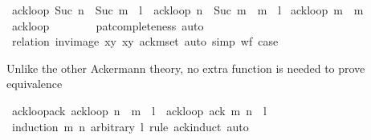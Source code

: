 \begin{isabellebody}
{\isacharbar}{\kern0pt}\ {\isachardoublequoteopen}ackloop\ {\isacharparenleft}{\kern0pt}Suc\ n\ {\isacharhash}{\kern0pt}\ Suc\ m\ {\isacharhash}{\kern0pt}\ l{\isacharparenright}{\kern0pt}\ {\isacharequal}{\kern0pt}\ ackloop\ {\isacharparenleft}{\kern0pt}n\ {\isacharhash}{\kern0pt}\ Suc\ m\ {\isacharhash}{\kern0pt}\ m\ {\isacharhash}{\kern0pt}\ l{\isacharparenright}{\kern0pt}{\isachardoublequoteclose}\isanewline
{\isacharbar}{\kern0pt}\ {\isachardoublequoteopen}ackloop\ {\isacharbrackleft}{\kern0pt}m{\isacharbrackright}{\kern0pt}\ {\isacharequal}{\kern0pt}\ m{\isachardoublequoteclose}\isanewline
{\isacharbar}{\kern0pt}\ {\isachardoublequoteopen}ackloop\ {\isacharbrackleft}{\kern0pt}{\isacharbrackright}{\kern0pt}\ {\isacharequal}{\kern0pt}\ \ {}{\isachardoublequoteclose}\isanewline
%
\isadelimproof
\ \ %
\endisadelimproof
%
\isatagproof
{}\isamarkupfalse%
\ pat{\isacharunderscore}{\kern0pt}completeness\ auto%
\endisatagproof
{\isafoldproof}%
%
\isadelimproof
\isanewline
%
\endisadelimproof
\isanewline
{}\isamarkupfalse%
\isanewline
%
\isadelimproof
\ \ %
\endisadelimproof
%
\isatagproof
{}\isamarkupfalse%
\ {\isacharparenleft}{\kern0pt}relation\ {\isachardoublequoteopen}inv{\isacharunderscore}{\kern0pt}image\ {\isacharbraceleft}{\kern0pt}{\isacharparenleft}{\kern0pt}x{\isacharcomma}{\kern0pt}y{\isacharparenright}{\kern0pt}{\isachardot}{\kern0pt}\ x{\isacharless}{\kern0pt}y{\isacharbraceright}{\kern0pt}\ ack{\isacharunderscore}{\kern0pt}mset{\isachardoublequoteclose}{\isacharparenright}{\kern0pt}\ {\isacharparenleft}{\kern0pt}auto\ simp{\isacharcolon}{\kern0pt}\ wf\ case{}{\isacharparenright}{\kern0pt}%
\endisatagproof
{\isafoldproof}%
%
\isadelimproof
%
\endisadelimproof
%
\begin{isamarkuptext}%
Unlike the other Ackermann theory, no extra function is needed to prove equivalence%
\end{isamarkuptext}\isamarkuptrue%
\isamarkupfalse%
\ ackloop{\isacharunderscore}{\kern0pt}ack{\isacharcolon}{\kern0pt}\ {\isachardoublequoteopen}ackloop\ {\isacharparenleft}{\kern0pt}n\ {\isacharhash}{\kern0pt}\ m\ {\isacharhash}{\kern0pt}\ l{\isacharparenright}{\kern0pt}\ {\isacharequal}{\kern0pt}\ ackloop\ {\isacharparenleft}{\kern0pt}ack\ m\ n\ {\isacharhash}{\kern0pt}\ l{\isacharparenright}{\kern0pt}{\isachardoublequoteclose}\isanewline
%
\isadelimproof
\ \ %
\endisadelimproof
%
\isatagproof
{}\isamarkupfalse%
\ {\isacharparenleft}{\kern0pt}induction\ m\ n\ arbitrary{\isacharcolon}{\kern0pt}\ l\ rule{\isacharcolon}{\kern0pt}\ ack{\isachardot}{\kern0pt}induct{\isacharparenright}{\kern0pt}\ auto%

\end{isabellebody}
